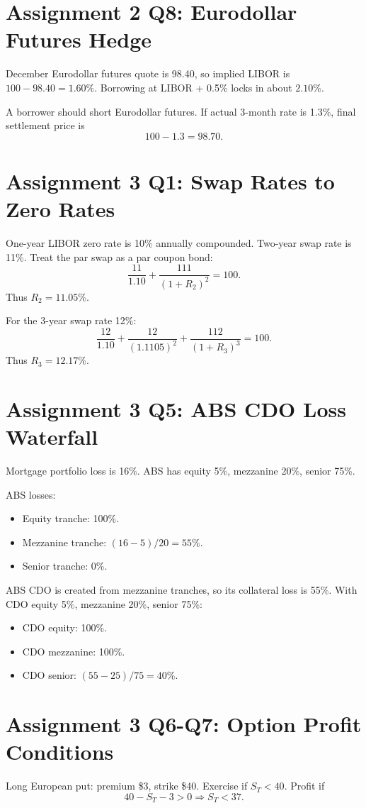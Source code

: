 \documentclass[11pt,a4paper,openany]{ctexbook}
\begin{document}
\section{Assignment 2 Q8: Eurodollar Futures Hedge}
December Eurodollar futures quote is 98.40, so implied LIBOR is $100-98.40=1.60\%$. Borrowing at LIBOR + 0.5\% locks in about $2.10\%$.

A borrower should short Eurodollar futures. If actual 3-month rate is 1.3\%, final settlement price is
\[
100-1.3=98.70.
\]

\section{Assignment 3 Q1: Swap Rates to Zero Rates}
One-year LIBOR zero rate is 10\% annually compounded. Two-year swap rate is 11\%. Treat the par swap as a par coupon bond:
\[
\frac{11}{1.10}+\frac{111}{(1+R_2)^2}=100.
\]
Thus $R_2=11.05\%$.

For the 3-year swap rate 12\%:
\[
\frac{12}{1.10}+\frac{12}{(1.1105)^2}+\frac{112}{(1+R_3)^3}=100.
\]
Thus $R_3=12.17\%$.

\section{Assignment 3 Q5: ABS CDO Loss Waterfall}
Mortgage portfolio loss is 16\%. ABS has equity 5\%, mezzanine 20\%, senior 75\%.

ABS losses:
\begin{itemize}
  \item Equity tranche: 100\%.
  \item Mezzanine tranche: $(16-5)/20=55\%$.
  \item Senior tranche: 0\%.
\end{itemize}

ABS CDO is created from mezzanine tranches, so its collateral loss is 55\%. With CDO equity 5\%, mezzanine 20\%, senior 75\%:
\begin{itemize}
  \item CDO equity: 100\%.
  \item CDO mezzanine: 100\%.
  \item CDO senior: $(55-25)/75=40\%$.
\end{itemize}

\section{Assignment 3 Q6-Q7: Option Profit Conditions}
Long European put: premium \$3, strike \$40. Exercise if $S_T<40$. Profit if
\[
40-S_T-3>0 \Rightarrow S_T<37.
\]
\end{document}

